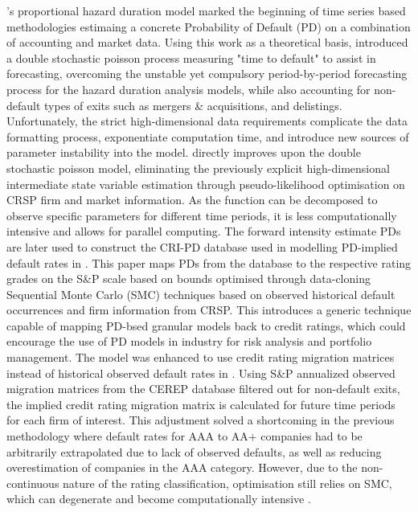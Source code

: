 \documentclass[10pt]{article}
\begin{document}
\begin{multicols*}{2}
\citep{shumway}'s proportional hazard duration model marked the beginning of time series based methodologies estimaing a concrete Probability of Default (PD) on a combination of accounting and market data. Using this work as a theoretical basis, \citep{duffie} introduced a double stochastic poisson process measuring "time to default" to assist in forecasting, 
overcoming the unstable yet compulsory period-by-period forecasting process for the hazard duration analysis models, while also accounting for non-default types of exits such as mergers \& acquisitions, and delistings. Unfortunately, the strict high-dimensional data requirements complicate the data formatting process, exponentiate computation time, and introduce new sources of parameter instability into the model. 
\citep{duan2012} directly improves upon the double stochastic poisson model, eliminating the previously explicit high-dimensional intermediate state variable estimation through pseudo-likelihood optimisation on CRSP firm and market information. As the function can be decomposed to observe specific parameters for different time periods, it is less computationally intensive and allows for parallel computing. 
The forward intensity estimate PDs are later used to construct the CRI-PD database used in modelling PD-implied default rates in \citep{duan2021}. This paper maps PDs from the database to the respective rating grades on the S\&P scale based on bounds optimised through data-cloning Sequential Monte Carlo (SMC) techniques \citep{duan2020} based on observed historical default occurrences and firm information from CRSP. 
This introduces a generic technique capable of mapping PD-bsed granular models back to credit ratings, which could encourage the use of PD models in industry for risk analysis and portfolio management. The model was enhanced to use credit rating migration matrices instead of historical observed default rates in \citep{duan2021-2}. Using S\&P annualized observed migration matrices from the CEREP database filtered out for non-default exits, 
the implied credit rating migration matrix is calculated for future time periods for each firm of interest. This adjustment solved a shortcoming in the previous methodology where default rates for AAA to AA+ companies had to be arbitrarily extrapolated due to lack of observed defaults, as well as reducing overestimation of companies in the AAA category. However, due to the non-continuous nature of the rating classification, 
optimisation still relies on SMC, which can degenerate and become computationally intensive \citep{bourgey}.


\end{multicols*}
\end{document}
